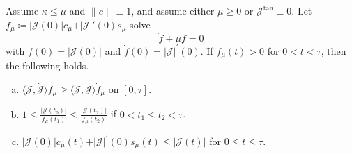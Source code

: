 \begin{theorem}
	Assume \(\kappa \leq \mu \) and \(\lVert \dot{c} \rVert \equiv 1\), and assume either \(\mu \geq 0\) or \(\mathcal{J} ^{\text{tan} } \equiv 0\). Let \(f_\mu \coloneqq \vert \mathcal{J} (0) \vert c_\mu + \vert \mathcal{J} \vert '(0) s_\mu \) solve
	\[
		\ddot{f} + \mu f = 0
	\]
	with \(f(0) = \vert \mathcal{J} (0) \vert \) and \(\dot{f} (0) = \vert \mathcal{J} \vert ^{\prime} (0)\). If \(f_\mu (t)> 0\) for \(0 < t < \tau \), then the following holds.
	\begin{enumerate}[(a)]
		\item \(\langle \mathcal{J} , \dot{\mathcal{J} }  \rangle f_\mu \geq \langle \mathcal{J} , \mathcal{J}  \rangle \dot{f} _\mu\) on \([0, \tau ]\).
		\item \(1 \leq \frac{\vert \mathcal{J} (t_0) \vert }{f_\mu (t_1)} \leq \frac{\vert \mathcal{J} (t_2) \vert }{f_\mu (t_2)}\) if \(0 < t_1 \leq t_2 < \tau \).
		\item \(\vert \mathcal{J} (0) \vert c_\mu (t) + \vert \mathcal{J}  \vert ^{\prime} (0) s_\mu (t) \leq \vert \mathcal{J} (t) \vert\) for \(0 \leq t \leq \tau \).
	\end{enumerate}
\end{theorem}
